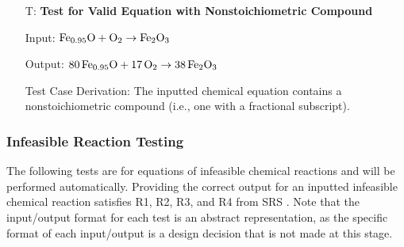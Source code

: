 \documentclass[12pt, titlepage]{article}
\newcounter{testnum} %
\begin{document}
\begin{enumerate}
  \item[T\refstepcounter{testnum}\thetestnum \label{test_nonstoich_valid_eqn}:]
    \textbf{Test for Valid Equation with Nonstoichiometric Compound}

    Input: $\ce{Fe_{0.95}O} + \ce{O2} \rightarrow \ce{Fe2O3}$
    \cite{doubtnut_when_nodate}

    Output: $\ce{80Fe_{0.95}O} + \ce{17O2} \rightarrow \ce{38Fe2O3}$

    Test Case Derivation: The inputted chemical equation contains a
    nonstoichiometric compound (i.e., one with a fractional subscript).

\end{enumerate}

\subsubsection{Infeasible Reaction Testing}

The following tests are for equations of infeasible chemical reactions and
will be performed automatically. Providing the correct output for an inputted
infeasible chemical reaction satisfies R1, R2, R3, and R4 from SRS . Note that the input/output format
for each test is an abstract representation, as the specific format of each
input/output is a design decision that is not made at this stage.
\end{document}
